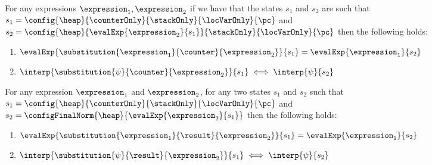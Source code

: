 \begin{substCntr}\label{substCntr}
For any expressions $ \expression_1, \expression_2 $ 
if we have that the states $s_1$ and $s_2$ are such that
 $s_1 =   \config{\heap}{\counterOnly}{ \stackOnly }{\locVarOnly}{\pc }$ and 
$s_2 =  \config{\heap}{\evalExp{ \expression_2}{ s_1  } }{ \stackOnly }{\locVarOnly}{\pc }  $ then 
the following holds:
\begin{enumerate}
      \item $\evalExp{\substitution{\expression_1}{ \counter }{ \expression_2 }}{ s_1 } = \evalExp{\expression_1}{s_2} $
      \item $\interp{\substitution{\psi}{ \counter }{ \expression_2 }}{ s_1 } \iff \interp{\psi}{s_2} $
\end{enumerate}
\end{substCntr} 




\begin{substRet}\label{substRet} 
For any expression $\expression_1$ and $\expression_2$,
for any two states $s_1$ and $s_2$  such that
$ s_1 =   \config{\heap}{\counterOnly}{ \stackOnly }{\locVarOnly}{\pc }$ and \\
$ s_2 =   \configFinalNorm{\heap}{\evalExp{\expression_2}{s_1} } $ then 
the following holds:
\begin{enumerate}
      \item $\evalExp{\substitution{\expression_1}{ \result }{ \expression_2 }}{ s_1 } = \evalExp{\expression_1}{s_2} $
      \item $\interp{\substitution{\psi}{ \result}{ \expression_2 }}{ s_1 } \iff \interp{\psi}{s_2} $
\end{enumerate}
\end{substRet}







